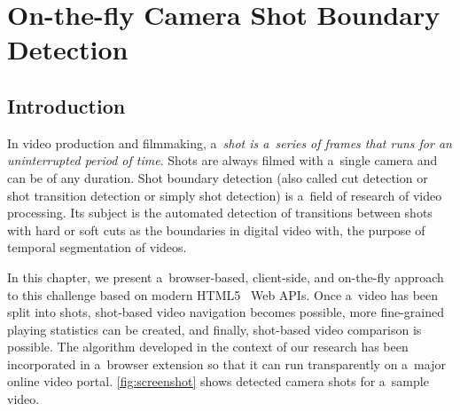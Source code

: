 \chapter{On-the-fly Camera Shot Boundary Detection}
\label{cha:shot-boundary-detection}

\ifpdf
    \graphicspath{{6_shot_boundary_detection/figures/PNG/}{6_shot_boundary_detection/figures/PDF/}{6_shot_boundary_detection/figures/}}
\else
    \graphicspath{{6_shot_boundary_detection/figures/EPS/}{6_shot_boundary_detection/figures/}}
\fi

\section{Introduction} \label{sec:videoshotboundarydetection}

In video production and filmmaking, a~\emph{shot is a~series of frames
that runs for an uninterrupted period of time}.
Shots are always filmed with a~single camera and can be of any duration. 
Shot boundary detection (also called cut detection or shot transition detection
or simply shot detection) is a~field of research of video processing.
Its subject is the automated detection of transitions between shots
with hard or soft cuts as the boundaries
in digital video with, the purpose of temporal segmentation of videos.

In this chapter, we present a~browser-based, client-side, and
on-the-fly approach to this challenge
based on modern HTML5~\cite{berjon2012html5} Web APIs.
Once a~video has been split into shots,
shot-based video navigation becomes possible,
more fine-grained playing statistics can be created,
and finally, shot-based video comparison is possible.
The algorithm developed in the context of our research
has been incorporated in a~browser extension
so that it can run transparently on a~major online video portal.
\autoref{fig:screenshot} shows detected camera
shots for a~sample video.

